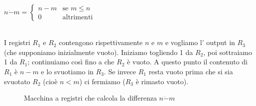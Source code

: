 \begin{esempio}[Differenza] \ \\
    \begin{center}
    $n \dot{-} m=
    \left\{ \begin{array}{ll}
    n-m & \textrm{se } m \leq n\\
    0 & \textrm{altrimenti}
    \end{array} \right.$
    \end{center}


    \ \\ I registri \( R_1 \) e \( R_2 \) contengono rispettivamente
    \( n \) e \( m \) e vogliamo l' output in \( R_{3} \) (che
    supponiamo inizialmente vuoto). Iniziamo togliendo 1 da \( R_2 \),
    poi sottraiamo 1 da \( R_1 \); continuiamo cos\`i fino a che \(
    R_2 \) \`e vuoto. A questo punto il contenuto di \( R_1 \) \`e $n
    - m$ e lo svuotiamo in \( R_{3} \). Se invece \( R_1 \) resta
    vuoto prima che si sia svuotato \( R_2 \) (cio\`e $n < m$) ci
    fermiamo (\( R_{3} \) \`e rimasto vuoto).

    \begin{figure}[hbtp]
    \hspace{0cm}

    \caption{Macchina a registri che calcola la differenza $n \dot{-} m$}
    \end{figure}

\end{esempio}

